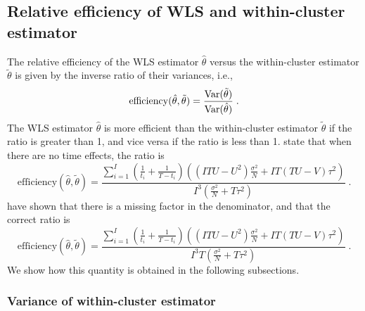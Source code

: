 \documentclass[10pt]{article}
\begin{document}
\subsection{Relative efficiency of WLS and within-cluster estimator} \label{apx:efficiency}

The relative efficiency of the WLS estimator $\hat{\theta}$ versus the within-cluster estimator $\tilde{\theta}$ is given by the inverse ratio of their variances, i.e.,
\[
\mathrm{efficiency}(\hat{\theta},\tilde{\theta}) = \frac{\mathrm{Var}(\tilde{\theta})}{\mathrm{Var}(\hat{\theta})} \;.
\]
The WLS estimator $\hat{\theta}$ is more efficient than the within-cluster estimator $\tilde{\theta}$ if the ratio is greater than 1, and vice versa if the ratio is less than 1. \textcite{Hussey:2007} state that when there are no time effects, the ratio is
\[
\mathrm{efficiency}(\hat{\theta},\tilde{\theta}) = \frac{\sum_{i=1}^I\left(\frac{1}{t_i}+\frac{1}{T-t_i}\right)\left((ITU-U^2)\frac{\sigma^2}{N}+IT(TU-V)\tau^2\right)}{I^3\left(\frac{\sigma^2}{N}+T\tau^2\right)} \;.
\]
\textcite{Liao:2015} have shown that there is a missing factor in the denominator, and that the correct ratio is
\[
\mathrm{efficiency}(\hat{\theta},\tilde{\theta}) = \frac{\sum_{i=1}^I\left(\frac{1}{t_i}+\frac{1}{T-t_i}\right)\left((ITU-U^2)\frac{\sigma^2}{N}+IT(TU-V)\tau^2\right)}{I^3T\left(\frac{\sigma^2}{N}+T\tau^2\right)} \;.
\]
We show how this quantity is obtained in the following subsections.

\subsubsection{Variance of within-cluster estimator} \label{apx:withincluster}
\end{document}
